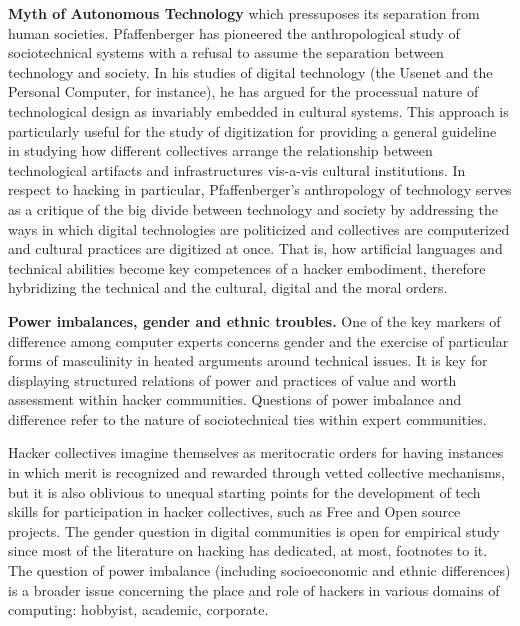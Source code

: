 \documentclass[10pt,letter,oneside]{scrartcl}
\begin{document}

{\bf Myth of Autonomous Technology} which pressuposes its separation from human societies.
Pfaffenberger has pioneered the anthropological study of sociotechnical systems with a
refusal to assume the separation between technology and society. In his studies of digital
technology (the Usenet and the Personal Computer, for instance), he has argued for the 
processual nature of technological design as invariably embedded in cultural systems. 
This approach is particularly useful for the study of digitization for providing a 
general guideline in studying how different collectives arrange the relationship between 
technological artifacts and infrastructures vis-a-vis cultural institutions. In respect 
to hacking in particular, Pfaffenberger's anthropology of technology serves as a critique
of the big divide between technology and society by addressing the ways in which 
digital technologies are politicized and collectives are computerized and cultural practices
are digitized at once. That is, how artificial languages and technical abilities become key 
competences of a hacker embodiment, therefore hybridizing the technical and the cultural, 
digital and the moral orders.

 
{\bf Power imbalances, gender and ethnic troubles.} One of the key markers of difference 
among computer experts concerns gender and the exercise of particular forms of 
masculinity in heated arguments around technical issues. It is key for displaying 
structured relations of power and practices of value and worth assessment within 
hacker communities.  Questions of power imbalance and difference refer to the 
nature of sociotechnical ties within expert communities.

Hacker collectives imagine themselves as meritocratic orders for having instances 
in which merit is recognized and rewarded through vetted collective mechanisms, 
but it is also oblivious to unequal starting points for the development of tech 
skills for participation in hacker collectives, such as Free and Open source 
projects. The gender question in digital communities is open for empirical study since
most of the literature on hacking has dedicated, at most, footnotes to it. The question 
of power imbalance (including socioeconomic and ethnic differences) is a broader issue 
concerning the place and role of hackers in various domains of computing: hobbyist, 
academic, corporate.
\end{document}
